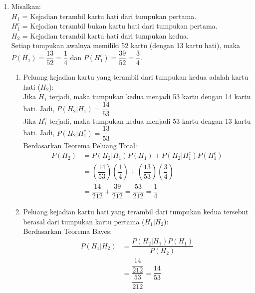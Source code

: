 \documentclass[11pt,letterpaper]{article}
\begin{document}
\begin{enumerate}
  \item Misalkan: \\
        $H_1$ = Kejadian terambil kartu hati dari tumpukan pertama. \\
        $H_1^c$ = Kejadian terambil bukan kartu hati dari tumpukan pertama. \\
        $H_2$ = Kejadian terambil kartu hati dari tumpukan kedua. \\
        Setiap tumpukan awalnya memiliki 52 kartu (dengan 13 kartu hati), maka $P(H_1) = \dfrac{13}{52} = \dfrac{1}{4}$ dan $P(H_1^c) = \dfrac{39}{52} = \dfrac{3}{4}$.

        \begin{enumerate}[label=\alph*.]
          \item Peluang kejadian kartu yang terambil dari tumpukan kedua adalah kartu hati ($H_2$): \\
                Jika $H_1$ terjadi, maka tumpukan kedua menjadi 53 kartu dengan 14 kartu hati. Jadi, $P(H_2|H_1) = \dfrac{14}{53}$. \\
                Jika $H_1^c$ terjadi, maka tumpukan kedua menjadi 53 kartu dengan 13 kartu hati. Jadi, $P(H_2|H_1^c) = \dfrac{13}{53}$. \\
                Berdasarkan Teorema Peluang Total:
                \begin{align*}
                  P(H_2) & = P(H_2|H_1)P(H_1) + P(H_2|H_1^c)P(H_1^c)                                                                     \\
                         & = \left(\dfrac{14}{53}\right)\left(\dfrac{1}{4}\right) + \left(\dfrac{13}{53}\right)\left(\dfrac{3}{4}\right) \\
                         & = \dfrac{14}{212} + \dfrac{39}{212} = \dfrac{53}{212} = \dfrac{1}{4}
                \end{align*}
          \item Peluang kejadian kartu hati yang terambil dari tumpukan kedua tersebut berasal dari tumpukan kartu pertama ($H_1|H_2$): \\
                Berdasarkan Teorema Bayes:
                \begin{align*}
                  P(H_1|H_2) & = \dfrac{P(H_2|H_1)P(H_1)}{P(H_2)}                          \\
                             & = \dfrac{\dfrac{14}{212}}{\dfrac{53}{212}} = \dfrac{14}{53}
                \end{align*}
        \end{enumerate}
        \vspace{0.3cm}


\end{enumerate}
\end{document}
